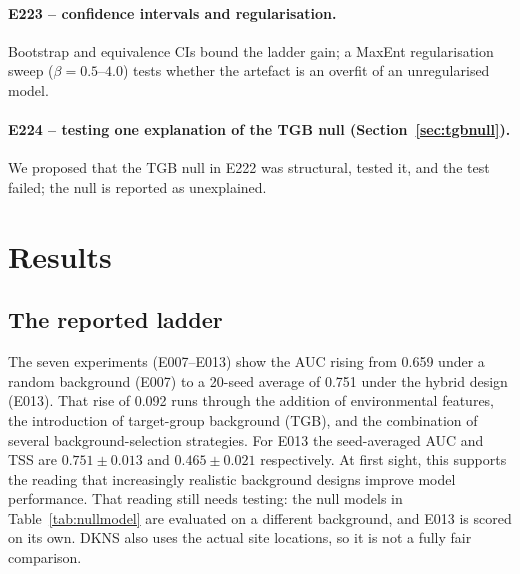 \documentclass[12pt]{article}
\begin{document}
\paragraph{E223 -- confidence intervals and regularisation.}
Bootstrap and equivalence CIs bound the ladder gain; a MaxEnt regularisation sweep ($\beta = 0.5$--$4.0$) tests whether the artefact is an overfit of an unregularised model.

\paragraph{E224 -- testing one explanation of the TGB null (Section~\ref{sec:tgbnull}).}
We proposed that the TGB null in E222 was structural, tested it, and the test failed; the null is reported as unexplained.

\section{Results}

\subsection{The reported ladder}
\label{sec:ladder}

The seven experiments (E007--E013) show the AUC rising from 0.659 under a random background (E007) to a 20-seed average of 0.751 under the hybrid design (E013).
That rise of 0.092 runs through the addition of environmental features, the introduction of target-group background (TGB), and the combination of several background-selection strategies.
For E013 the seed-averaged AUC and TSS are $0.751 \pm 0.013$ and $0.465 \pm 0.021$ respectively.
At first sight, this supports the reading that increasingly realistic background designs improve model performance.
That reading still needs testing: the null models in Table~\ref{tab:nullmodel} are evaluated on a different background, and E013 is scored on its own.
DKNS also uses the actual site locations, so it is not a fully fair comparison.
\end{document}
